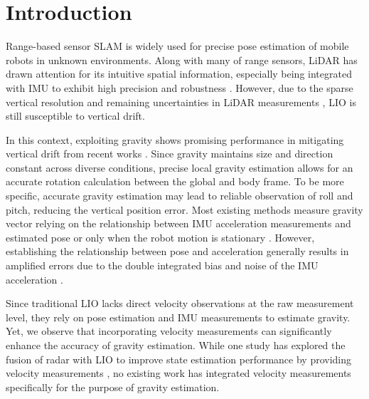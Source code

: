 \section{Introduction}
\label{sec:intro}

Range-based sensor \ac{SLAM} is widely used for precise pose estimation of mobile robots in unknown environments. Along with many of range sensors, \ac{LiDAR} has drawn attention for its intuitive spatial information, especially being integrated with \ac{IMU} to exhibit high precision and robustness \cite{FAST-LIO, LINS, POINT-LIO}. However, due to the sparse vertical resolution and remaining uncertainties in \ac{LiDAR} measurements \cite{lidar_bias}, \ac{LIO} is still susceptible to vertical drift. 

In this context, exploiting gravity shows promising performance in mitigating vertical drift from recent works \cite{kubelka2022gravity, D-LIOM, nemiroff2023joint,wildcat,agha2021nebula}. Since gravity maintains size and direction constant across diverse conditions, precise local gravity estimation allows for an accurate rotation calculation between the global and body frame. To be more specific, accurate gravity estimation may lead to reliable observation of roll and pitch, reducing the vertical position error. Most existing methods measure gravity vector relying on the relationship between \ac{IMU} acceleration measurements and estimated pose \cite{D-LIOM, nemiroff2023joint,wildcat} or only when the robot motion is stationary \cite{agha2021nebula}. However, establishing the relationship between pose and acceleration generally results in amplified errors due to the double integrated bias and noise of the \ac{IMU} acceleration \cite{forster2016manifold}.

Since traditional \ac{LIO} lacks direct velocity observations at the raw measurement level, they rely on pose estimation and \ac{IMU} measurements to estimate gravity. Yet, we observe that incorporating velocity measurements can significantly enhance the accuracy of gravity estimation. While one study has explored the fusion of radar with \ac{LIO} to improve state estimation performance by providing velocity measurements \cite{DR-LRIO}, no existing work has integrated velocity measurements specifically for the purpose of gravity estimation.

